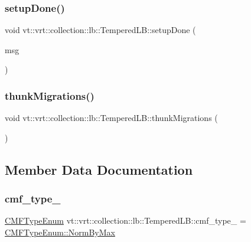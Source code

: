 \subsubsection{\texorpdfstring{setup\+Done()}{setupDone()}}
{\footnotesize\ttfamily void vt\+::vrt\+::collection\+::lb\+::\+Tempered\+L\+B\+::setup\+Done (\begin{DoxyParamCaption}\item[{\hyperlink{structvt_1_1vrt_1_1collection_1_1lb_1_1_tempered_l_b_a3e688a286b16334d43666bae581231b7}{Reduce\+Msg\+Type} $\ast$}]{msg }\end{DoxyParamCaption})\hspace{0.3cm}{\ttfamily [protected]}}

\mbox{\label{structvt_1_1vrt_1_1collection_1_1lb_1_1_tempered_l_b_ad17685a3f16fd1e56e7db27b6ab702ca}} 
\subsubsection{\texorpdfstring{thunk\+Migrations()}{thunkMigrations()}}
{\footnotesize\ttfamily void vt\+::vrt\+::collection\+::lb\+::\+Tempered\+L\+B\+::thunk\+Migrations (\begin{DoxyParamCaption}{ }\end{DoxyParamCaption})\hspace{0.3cm}{\ttfamily [protected]}}



\subsection{Member Data Documentation}
\mbox{\label{structvt_1_1vrt_1_1collection_1_1lb_1_1_tempered_l_b_ac18e0879c068166c1b5a382dc37b0905}} 
\subsubsection{\texorpdfstring{cmf\+\_\+type\+\_\+}{cmf\_type\_}}
{\footnotesize\ttfamily \hyperlink{namespacevt_1_1vrt_1_1collection_1_1lb_ada1e381e6b19ba9f8277d4f698445404}{C\+M\+F\+Type\+Enum} vt\+::vrt\+::collection\+::lb\+::\+Tempered\+L\+B\+::cmf\+\_\+type\+\_\+ = \hyperlink{namespacevt_1_1vrt_1_1collection_1_1lb_ada1e381e6b19ba9f8277d4f698445404a2a17cd13e37fb3cacfea703c5edc3680}{C\+M\+F\+Type\+Enum\+::\+Norm\+By\+Max}\hspace{0.3cm}{\ttfamily [private]}}

